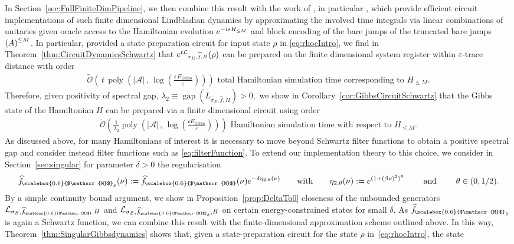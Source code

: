 \documentclass[11pt]{amsart}
\newcommand{\1}{\mathbbm{1}}
\newcommand{\cL}{\mathcal{L}}
\newcommand{\eps}{\varepsilon}
\renewcommand{\epsilon}{\varepsilon}
\newcommand{\hatfM}{\widehat{f}_{\!\scalebox{0.6}{$\mathscr{M}$}}
}
\newcommand{\hatfMdelta}{\widehat{f}_{\!\scalebox{0.6}{$\mathscr{M}$}_\delta}}
\theoremstyle{plain}
\theoremstyle{definition}
\theoremstyle{remark}
\numberwithin{equation}{section}
\begin{document}
In Section~\ref{sec:FullFiniteDimPipeline}, we then combine this result with the work of \cite{chen2023quantum,gilyen2024quantum,chen2023efficient,ding2025efficient}, in particular \cite[Theorem 18]{ding2025efficient}, which provide efficient circuit implementations of such finite dimensional Lindbladian dynamics by approximating the involved time integrals via linear combinations of unitaries \cite{LiWang23} given oracle access to the Hamiltonian evolution $e^{\smash{-isH_{\le M}}}$  and block encoding of the bare jumps of the truncated bare jumps $\left(A\right)^{\smash{\le M}}$. In particular, provided a state preparation circuit for input state $\rho$ in \eqref{eq:rhocIntro}, we find in Theorem~\ref{thm:CircuitDynamicsSchwartz} that
$e^{\smash{t\cL_{\sigma_E,\widehat f, H}}}(\rho)$ can be prepared on the finite dimensional system register within $\eps$-trace distance with order
\begin{align*}
\widetilde{\mathcal{O}}\left( \,t\,\operatorname{poly}\left(|\mathcal{A}|\,,\, \log\left(\frac{\mathfrak{c}\,E_{\operatorname{Gibbs}}}{\epsilon}\right)\right)\right) \text{ total Hamiltonian simulation time corresponding to }H_{\le M}.
\end{align*}
Therefore, given positivity of spectral gap, $\lambda_2\equiv \operatorname{gap}(L_{\sigma_E,\widehat f, H})>0,$ we show in Corollary~\ref{cor:GibbsCircuitSchwartz} that the Gibbs state of the Hamiltonian $H$ can be prepared via a finite dimensional circuit using order
\begin{align*}
\widetilde{\mathcal{O}}\left(\frac{1}{\lambda_2}\operatorname{poly}\left(|\mathcal{A}|\,,\,\log\left(\frac{\mathfrak{c}E_{\operatorname{Gibbs}}}{\epsilon}\right)\right)\right)\text{ Hamiltonian simulation time with respect to } H_{\le M}.
\end{align*}
As discussed above, for many Hamiltonians of interest it is necessary to move beyond Schwartz filter functions to obtain a positive spectral gap and consider instead filter functions such as  \eqref{eq:filterFunction}.
To extend our implementation theory to this choice, we consider in Section~\ref{sec:singular} for parameter $\delta>0$ the regularisation
\begin{align}\label{eq:hatfMdeltaeqIntro}
    \hatfMdelta(\nu) := \hatfM(\nu)e^{-\delta\eta_{2,\theta}(\nu)}\qquad \text{with} \qquad  \eta_{2,\theta}(\nu) := e^{(1+(\beta\nu)^2)^\theta} \qquad \text{ and }\qquad \theta\in(0,1/2).
\end{align}
 By a simple continuity bound argument, we show in Proposition~\ref{prop:DeltaTo0} closeness of the unbounded generators $\cL_{\smash{\sigma_E,\hatfM,H}}$ and $\cL_{\smash{\sigma_E,\hatfMdelta,H}}$ on certain energy-constrained states for small $\delta.$ As $\hatfMdelta$ is again a Schwartz function, we can combine this result with the finite-dimensional approximation scheme outlined above. In this way, Theorem~\ref{thm:SingularGibbsdynamics} shows that, given a state-preparation circuit for the state $\rho$ in~\eqref{eq:rhocIntro}, the state
\end{document}
